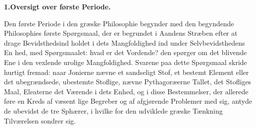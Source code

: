 \documentclass[12pt,a4paper]{book}
\begin{document}
\begin{center}
\textbf{1.\enspace Oversigt over første Periode.}
\end{center}
Den første Periode i den græske Philosophie begynder
med den begyndende Philosophies første Spørgsmaal, der er
begrundet i Aandens Stræben efter at drage Bevidsthedsind\-%
holdet i dets Mangfoldighed ind under Selvbevidsthedens En\-%
hed, med Spørgsmaalet: hvad er det Vordende? den spørger
om det blivende Ene i den vexlende urolige Mangfoldighed.
Svarene paa dette Spørgsmaal skride hurtigt fremad: naar
Jonierne nævne et sandseligt Stof, et bestemt Element eller
det ubegrændsede, ubestemte Stoflige, nævne Pythagoræerne
Tallet, det Stofliges Maal, Eleaterne det Værende i dets Enhed,
og i disse Bestemmelser, der allerede føre en Kreds af væsent\-%
lige Begreber og af afgjørende Problemer med sig, antyde de
ubevidst de tre Sphærer, i hvilke for den udviklede græske
Tænkning Tilværelsen sondrer sig.
\end{document}
